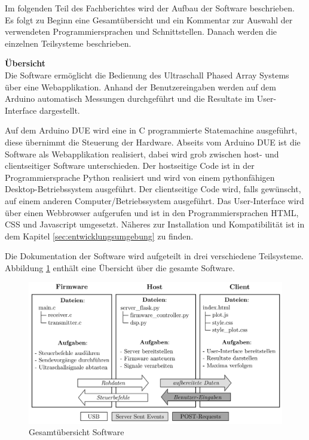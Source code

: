 Im folgenden Teil des Fachberichtes wird der Aufbau der Software beschrieben. Es folgt zu Beginn eine Gesamtübersicht und ein Kommentar zur Auswahl der verwendeten Programmiersprachen und Schnittstellen. Danach werden die einzelnen Teilsysteme beschrieben.

\textbf{Übersicht}\\
Die Software ermöglicht die Bedienung des Ultraschall Phased Array Systems über eine Web\-applikation. Anhand der Benutzereingaben werden auf dem Arduino automatisch Messungen durchgeführt und die Resultate im User-Interface dargestellt.

Auf dem Arduino DUE wird eine in C programmierte Statemachine ausgeführt, diese übernimmt die Steuerung der Hardware. Abseits vom Arduino DUE ist die Software als Webapplikation realisiert, dabei wird grob zwischen host- und clientseitiger Software unterschieden.
Der hostseitige Code ist in der Programmiersprache Python realisiert und wird von einem pythonfähigen Desktop-Betriebssystem ausgeführt.
Der clientseitige Code wird, falls gewünscht, auf einem anderen Computer/Betriebssystem ausgeführt. Das User-Interface wird über einen Webbrowser aufgerufen und ist in den Programmiersprachen HTML, CSS und Java\-script umgesetzt.
Näheres zur Installation und Kompatibilität ist in dem Kapitel \ref{sec:entwicklungsumgebung} zu finden.

Die Dokumentation der Software wird aufgeteilt in drei verschiedene Teilsysteme. Abbildung \ref{fig:image_software_schema}  enthält eine Übersicht über die gesamte Software.

\begin{figure}[htb]
\begin{center}
\includegraphics[width=\textwidth]{graphics/image_software_schema.png}
\end{center}
\caption{Gesamtübersicht Software} %
\label{fig:image_software_schema}
\end{figure}
%

